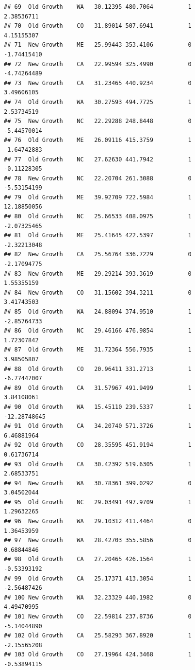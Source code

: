 \documentclass[
]{article}
\begin{document}
\begin{verbatim}
## 69  Old Growth    WA   30.12395 480.7064          1          2.38536711
## 70  Old Growth    CO   31.89014 507.6941          1          4.15155307
## 71  New Growth    ME   25.99443 353.4106          0         -1.74415410
## 72  New Growth    CA   22.99594 325.4990          0         -4.74264489
## 73  New Growth    CA   31.23465 440.9234          0          3.49606105
## 74  Old Growth    WA   30.27593 494.7725          1          2.53734519
## 75  New Growth    NC   22.29288 248.8448          0         -5.44570014
## 76  Old Growth    ME   26.09116 415.3759          1         -1.64742883
## 77  Old Growth    NC   27.62630 441.7942          1         -0.11228305
## 78  New Growth    NC   22.20704 261.3088          0         -5.53154199
## 79  Old Growth    ME   39.92709 722.5984          1         12.18850056
## 80  Old Growth    NC   25.66533 408.0975          1         -2.07325465
## 81  Old Growth    ME   25.41645 422.5397          1         -2.32213048
## 82  New Growth    CA   25.56764 336.7229          0         -2.17094775
## 83  New Growth    ME   29.29214 393.3619          0          1.55355159
## 84  New Growth    CO   31.15602 394.3211          0          3.41743503
## 85  Old Growth    WA   24.88094 374.9510          1         -2.85764733
## 86  Old Growth    NC   29.46166 476.9854          1          1.72307842
## 87  Old Growth    ME   31.72364 556.7935          1          3.98505807
## 88  Old Growth    CO   20.96411 331.2713          1         -6.77447007
## 89  Old Growth    CA   31.57967 491.9499          1          3.84108061
## 90  Old Growth    WA   15.45110 239.5337          1        -12.28748645
## 91  Old Growth    CA   34.20740 571.3726          1          6.46881964
## 92  Old Growth    CO   28.35595 451.9194          1          0.61736714
## 93  Old Growth    CA   30.42392 519.6305          1          2.68533751
## 94  New Growth    WA   30.78361 399.0292          0          3.04502044
## 95  Old Growth    NC   29.03491 497.9709          1          1.29632265
## 96  New Growth    WA   29.10312 411.4464          0          1.36453959
## 97  New Growth    WA   28.42703 355.5856          0          0.68844846
## 98  Old Growth    CA   27.20465 426.1564          1         -0.53393192
## 99  Old Growth    CA   25.17371 413.3054          1         -2.56487426
## 100 New Growth    WA   32.23329 440.1982          0          4.49470995
## 101 New Growth    CO   22.59814 237.8736          0         -5.14044890
## 102 Old Growth    CA   25.58293 367.8920          1         -2.15565208
## 103 Old Growth    CO   27.19964 424.3468          1         -0.53894115

\end{verbatim}
\end{document}

